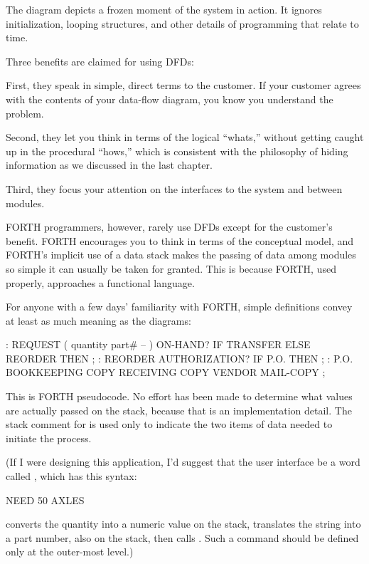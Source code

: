 The diagram depicts a frozen moment of the system in action. It
ignores initialization, looping structures, and other details of
programming that relate to time.

Three benefits are claimed for using DFDs:

First, they speak in simple, direct terms to the customer. If your
customer agrees with the contents of your data-flow diagram, you know
you understand the problem.

Second, they let you think in terms of the logical ``whats,'' without
getting caught up in the procedural ``hows,'' which is consistent with
the philosophy of hiding information as we discussed in the last chapter.

Third, they focus your attention on the interfaces to the system and
between modules.

FORTH programmers, however, rarely use DFDs except for the customer's
benefit. FORTH encourages you to think in terms of the conceptual
model, and FORTH's implicit use of a data stack makes the passing of
data among modules so simple it can usually be taken for granted.
This is because FORTH, used properly, approaches a functional language.

For anyone with a few days' familiarity with FORTH, simple definitions
convey at least as much meaning as the diagrams:

\begin{Code}
: REQUEST  ( quantity part# -- )
   ON-HAND?  IF  TRANSFER  ELSE  REORDER  THEN ;
: REORDER   AUTHORIZATION?  IF  P.O.  THEN ;
: P.O.   BOOKKEEPING COPY   RECEIVING COPY
   VENDOR MAIL-COPY ;
\end{Code}
This is FORTH pseudocode. No effort has been made to determine what
values are actually passed on the stack, because that is an
implementation detail. The stack comment for  is used
only to indicate the two items of data needed to initiate the process.

(If I were designing this application, I'd suggest that the user
interface be a word called , which has this syntax:

\begin{Code}
NEED 50 AXLES
\end{Code}

\noindent {} converts the quantity into a numeric value on
the stack, translates the string  into a part number,
also on the stack, then calls . Such a command should
be defined only at the outer-most level.)

